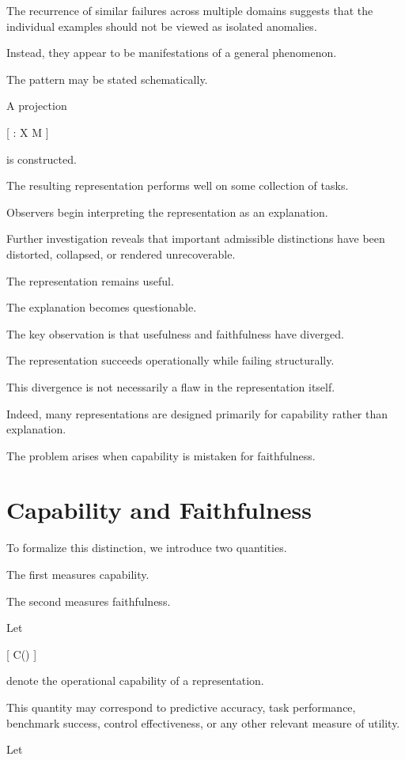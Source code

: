 \documentclass[11pt,oneside,openany]{book}
\begin{document}
The recurrence of similar failures across multiple domains suggests that the individual examples should not be viewed as isolated anomalies.

Instead, they appear to be manifestations of a general phenomenon.

The pattern may be stated schematically.

A projection

[
\pi
:
\mathcal X
\rightarrow
\mathcal M
]

is constructed.

The resulting representation performs well on some collection of tasks.

Observers begin interpreting the representation as an explanation.

Further investigation reveals that important admissible distinctions have been distorted, collapsed, or rendered unrecoverable.

The representation remains useful.

The explanation becomes questionable.

The key observation is that usefulness and faithfulness have diverged.

The representation succeeds operationally while failing structurally.

This divergence is not necessarily a flaw in the representation itself.

Indeed, many representations are designed primarily for capability rather than explanation.

The problem arises when capability is mistaken for faithfulness.

\section{Capability and Faithfulness}

To formalize this distinction, we introduce two quantities.

The first measures capability.

The second measures faithfulness.

Let

[
C(\pi)
]

denote the operational capability of a representation.

This quantity may correspond to predictive accuracy, task performance, benchmark success, control effectiveness, or any other relevant measure of utility.

Let
\end{document}
